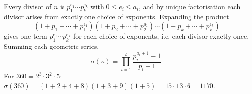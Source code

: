 Every divisor of $n$ is $p_1^{e_1}\cdots p_k^{e_k}$ with $0\le e_i\le a_i$, and by unique factorisation each divisor arises from exactly one choice of exponents. Expanding the product
\[\left(1+p_1+\cdots+p_1^{a_1}\right)\left(1+p_2+\cdots+p_2^{a_2}\right)\cdots\left(1+p_k+\cdots+p_k^{a_k}\right)\]
gives one term $p_1^{e_1}\cdots p_k^{e_k}$ for each choice of exponents, i.e. each divisor exactly once. Summing each geometric series,
\[\boxed{\sigma(n)=\prod_{i=1}^{k}\dfrac{p_i^{a_i+1}-1}{p_i-1}}.\]
For $360=2^3\cdot3^2\cdot5$: $\sigma(360)=(1+2+4+8)(1+3+9)(1+5)=15\cdot13\cdot6=\boxed{1170}$.

